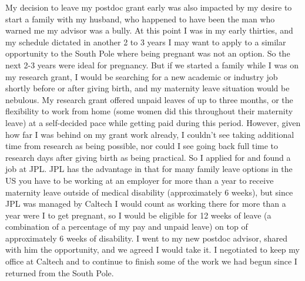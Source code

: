 \documentclass[utf8]{frontiersSCNS} %
\begin{document}
My decision to leave my postdoc grant early was also impacted by my desire to start a family with my husband, who happened to have been the man who warned me my advisor was a bully. At this point I was in my early thirties, and my schedule dictated in another 2 to 3 years I may want to apply to a similar opportunity to the South Pole where being pregnant was not an option. So the next 2-3 years were ideal for pregnancy. But if we started a family while I was on my research grant, I would be searching for a new academic or industry job shortly before or after giving birth, and my maternity leave situation would be nebulous. My research grant offered unpaid leaves of up to three months, or the flexibility to work from home (some women did this throughout their maternity leave) at a self-decided pace while getting paid during this period. However, given how far I was behind on my grant work already, I couldn't see taking additional time from research as being possible, nor could I see going back full time to research days after giving birth as being practical. So I applied for and found a job at JPL. JPL has the advantage in that for many family leave options in the US you have to be working at an employer for more than a year to receive maternity leave outside of medical disability (approximately 6 weeks), but since JPL was managed by Caltech I would count as working there for more than a year were I to get pregnant, so I would be eligible for 12 weeks of leave (a combination of a percentage of my pay and unpaid leave) on top of approximately 6 weeks of disability. I went to my new postdoc advisor, shared with him the opportunity, and we agreed I would take it. I negotiated to keep my office at Caltech and to continue to finish some of the work we had begun since I returned from the South Pole. 
\end{document}
